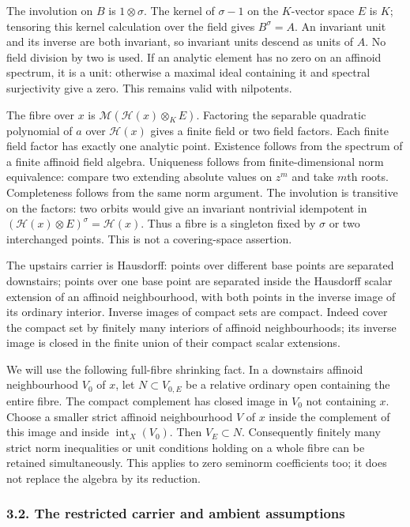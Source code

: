 \documentclass[
  11pt,
]{article}
\begin{document}
The involution on \(B\) is \(1\otimes\sigma\). The kernel of
\(\sigma-1\) on the \(K\)-vector space \(E\) is \(K\); tensoring this
kernel calculation over the field gives \(B^\sigma=A\). An invariant
unit and its inverse are both invariant, so invariant units descend as
units of \(A\). No field division by two is used. If an analytic element
has no zero on an affinoid spectrum, it is a unit: otherwise a maximal
ideal containing it and spectral surjectivity give a zero. This remains
valid with nilpotents.

The fibre over \(x\) is \(\mathcal M(\mathcal H(x)\otimes_K E)\).
Factoring the separable quadratic polynomial of \(a\) over
\(\mathcal H(x)\) gives a finite field or two field factors. Each finite
field factor has exactly one analytic point. Existence follows from the
spectrum of a finite affinoid field algebra. Uniqueness follows from
finite-dimensional norm equivalence: compare two extending absolute
values on \(z^m\) and take \(m\)th roots. Completeness follows from the
same norm argument. The involution is transitive on the factors: two
orbits would give an invariant nontrivial idempotent in
\((\mathcal H(x)\otimes E)^\sigma=\mathcal H(x)\). Thus a fibre is a
singleton fixed by \(\sigma\) or two interchanged points. This is not a
covering-space assertion.

The upstairs carrier is Hausdorff: points over different base points are
separated downstairs; points over one base point are separated inside
the Hausdorff scalar extension of an affinoid neighbourhood, with both
points in the inverse image of its ordinary interior. Inverse images of
compact sets are compact. Indeed cover the compact set by finitely many
interiors of affinoid neighbourhoods; its inverse image is closed in the
finite union of their compact scalar extensions.

We will use the following full-fibre shrinking fact. In a downstairs
affinoid neighbourhood \(V_0\) of \(x\), let \(N\subset V_{0,E}\) be a
relative ordinary open containing the entire fibre. The compact
complement has closed image in \(V_0\) not containing \(x\). Choose a
smaller strict affinoid neighbourhood \(V\) of \(x\) inside the
complement of this image and inside \(\operatorname{int}_X(V_0)\). Then
\(V_E\subset N\). Consequently finitely many strict norm inequalities or
unit conditions holding on a whole fibre can be retained simultaneously.
This applies to zero seminorm coefficients too; it does not replace the
algebra by its reduction.

\subsubsection{3.2. The restricted carrier and ambient
assumptions}\label{the-restricted-carrier-and-ambient-assumptions}
\end{document}

